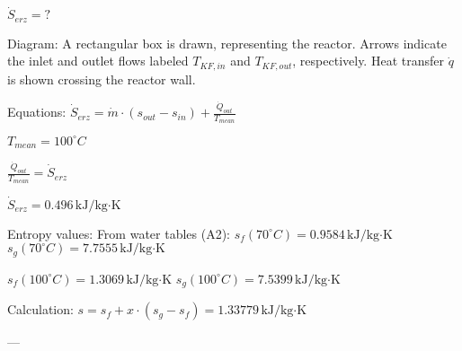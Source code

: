 \( \dot{S}_{erz} = ? \)  

Diagram:  
A rectangular box is drawn, representing the reactor. Arrows indicate the inlet and outlet flows labeled \( T_{KF,in} \) and \( T_{KF,out} \), respectively. Heat transfer \( \dot{q} \) is shown crossing the reactor wall.  

Equations:  
\( \dot{S}_{erz} = \dot{m} \cdot (s_{out} - s_{in}) + \frac{\dot{Q}_{out}}{T_{mean}} \)  

\( T_{mean} = 100^\circ C \)  

\( \frac{\dot{Q}_{out}}{T_{mean}} = \dot{S}_{erz} \)  

\( \dot{S}_{erz} = 0.496 \, \text{kJ/kg·K} \)  

Entropy values:  
From water tables (A2):  
\( s_f(70^\circ C) = 0.9584 \, \text{kJ/kg·K} \)  
\( s_g(70^\circ C) = 7.7555 \, \text{kJ/kg·K} \)  

\( s_f(100^\circ C) = 1.3069 \, \text{kJ/kg·K} \)  
\( s_g(100^\circ C) = 7.5399 \, \text{kJ/kg·K} \)  

Calculation:  
\( s = s_f + x \cdot (s_g - s_f) = 1.33779 \, \text{kJ/kg·K} \)  

---